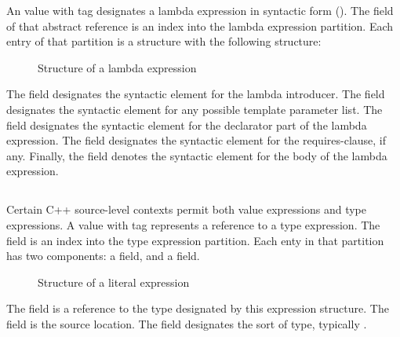 An  value with tag  designates a lambda expression in syntactic form ().
The  field of that abstract reference is an index into the lambda expression partition.
Each entry of that partition is a structure with the following structure:
%
\begin{figure}[H]
	\centering
	\caption{Structure of a lambda expression}
	\label{fig:ifc-lambda-structure}
\end{figure}
%

The  field designates the syntactic element for the lambda introducer.
The  field designates the syntactic element for any possible template parameter list.
The  field designates the syntactic element for the declarator part of the lambda expression.
The  field designates the syntactic element for the requires-clause, if any.
Finally, the  field denotes the syntactic element for the body of the lambda expression. 





\subsection{}
\label{sec:ifc:ExprSort:Type}

Certain C++ source-level contexts permit both value expressions and type expressions.
A  value with tag  represents a reference to a type expression.
The  field is an index into the type expression partition.
Each enty in that partition has two components: a  field, and a  field.
%
\begin{figure}[H]
	\centering
	\caption{Structure of a literal expression}
	\label{fig:ifc-type-expr-structure}
\end{figure}
%
The  field is a reference to the type designated by this expression structure.
The  field is the source location.
The  field designates the sort of type, typically .

